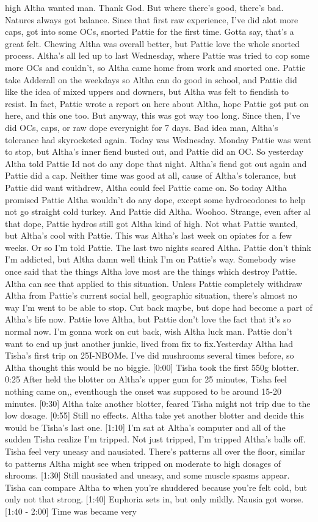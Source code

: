 \documentclass[12pt]{book}
\begin{document}
high Altha wanted man. Thank God. But where there's good, there's bad. Natures always got balance. Since that first raw experience, I've did alot more caps, got into some OCs, snorted Pattie for the first time. Gotta say, that's a great felt. Chewing Altha was overall better, but Pattie love the whole snorted process. Altha's all led up to last Wednesday, where Pattie was tried to cop some more OCs and couldn't, so Altha came home from work and snorted one. Pattie take Adderall on the weekdays so Altha can do good in school, and Pattie did like the idea of mixed uppers and downers, but Altha was felt to fiendish to resist. In fact, Pattie wrote a report on here about Altha, hope Pattie got put on here, and this one too. But anyway, this was got way too long. Since then, I've did OCs, caps, or raw dope everynight for 7 days. Bad idea man, Altha's tolerance had skyrocketed again. Today was Wednesday. Monday Pattie was went to stop, but Altha's inner fiend busted out, and Pattie did an OC. So yesterday Altha told Pattie Id not do any dope that night. Altha's fiend got out again and Pattie did a cap. Neither time was good at all, cause of Altha's tolerance, but Pattie did want withdrew, Altha could feel Pattie came on. So today Altha promised Pattie Altha wouldn't do any dope, except some hydrocodones to help not go straight cold turkey. And Pattie did Altha. Woohoo. Strange, even after al that dope, Pattie hydros still got Altha kind of high. Not what Pattie wanted, but Altha's cool with Pattie. This was Altha's last week on opiates for a few weeks. Or so I'm told Pattie. The last two nights scared Altha. Pattie don't think I'm addicted, but Altha damn well think I'm on Pattie's way. Somebody wise once said that the things Altha love most are the things which destroy Pattie. Altha can see that applied to this situation. Unless Pattie completely withdraw Altha from Pattie's current social hell, geographic situation, there's almost no way I'm went to be able to stop. Cut back maybe, but dope had become a part of Altha's life now. Pattie love Altha, but Pattie don't love the fact that it's so normal now. I'm gonna work on cut back, wish Altha luck man. Pattie don't want to end up just another junkie, lived from fix to fix.Yesterday Altha had Tisha's first trip on 25I-NBOMe. I've did mushrooms several times before, so Altha thought this would be no biggie. [0:00] Tisha took the first 550g blotter. 0:25 After held the blotter on Altha's upper gum for 25 minutes, Tisha feel nothing came on,, eventhough the onset was supposed to be around 15-20 minutes. [0:30] Altha take another blotter, feared Tisha might not trip due to the low dosage. [0:55] Still no effects. Altha take yet another blotter and decide this would be Tisha's last one. [1:10] I'm sat at Altha's computer and all of the sudden Tisha realize I'm tripped. Not just tripped, I'm tripped Altha's balls off. Tisha feel very uneasy and nausiated. There's patterns all over the floor, similar to patterns Altha might see when tripped on moderate to high dosages of shrooms. [1:30] Still nausiated and uneasy, and some muscle spasms appear. Tisha can compare Altha to when you're shuddered because you're felt cold, but only not that strong. [1:40] Euphoria sets in, but only mildly. Nausia got worse. [1:40 - 2:00] Time was became very 
\end{document}
